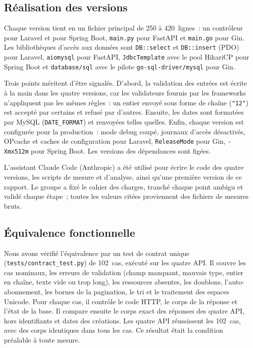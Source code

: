 \documentclass[conference,a4paper]{IEEEtran}
\begin{document}
\subsection{Réalisation des versions}
Chaque version tient en un fichier principal de 250 à 420~lignes~: un
contrôleur pour Laravel et pour Spring Boot, \texttt{main.py} pour
FastAPI et \texttt{main.go} pour Gin. Les bibliothèques d'accès aux
données sont \texttt{DB::select} et \texttt{DB::insert} (PDO) pour
Laravel, \texttt{aiomysql} pour FastAPI, \texttt{JdbcTemplate} avec le
pool HikariCP pour Spring Boot et \texttt{database/sql} avec le pilote
\texttt{go-sql-driver/mysql} pour Gin.

Trois points méritent d'être signalés. D'abord, la validation des
entrées est écrite à la main dans les quatre versions, car les
validateurs fournis par les frameworks n'appliquent pas les mêmes
règles~: un entier envoyé sous forme de chaîne (\texttt{"12"}) est
accepté par certains et refusé par d'autres. Ensuite, les dates sont
formatées par MySQL (\texttt{DATE\_FORMAT}) et renvoyées telles
quelles. Enfin, chaque version est configurée pour la production~:
mode debug coupé, journaux d'accès désactivés, OPcache et caches de
configuration pour Laravel, \texttt{ReleaseMode} pour Gin,
\texttt{-Xmx512m} pour Spring Boot. Les versions des dépendances sont
figées.

L'assistant Claude Code (Anthropic) a été utilisé pour écrire le code
des quatre versions, les scripts de mesure et d'analyse, ainsi qu'une
première version de ce rapport. Le groupe a fixé le cahier des charges,
tranché chaque point ambigu et validé chaque étape~; toutes les valeurs
citées proviennent des fichiers de mesures bruts.

\subsection{Équivalence fonctionnelle}
Nous avons vérifié l'équivalence par un test de contrat unique
(\texttt{tests/contract\_test.py}) de 102~cas, exécuté sur les quatre
API. Il couvre les cas nominaux, les erreurs de validation (champ
manquant, mauvais type, entier en chaîne, texte vide ou trop long), les
ressources absentes, les doublons, l'auto-abonnement, les bornes de la
pagination, le tri et le traitement des espaces Unicode. Pour chaque
cas, il contrôle le code HTTP, le corps de la réponse et l'état de la
base. Il compare ensuite le corps exact des réponses des quatre API,
hors identifiants et dates des créations. Les quatre API réussissent
les 102~cas, avec des corps identiques dans tous les cas. Ce résultat
était la condition préalable à toute mesure.
\end{document}
